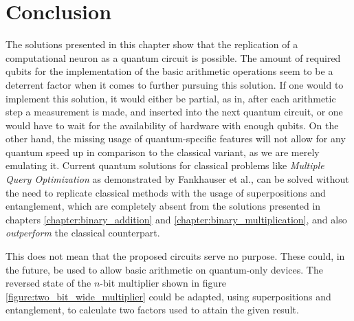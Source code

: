 \newpage


\section{Conclusion}

The solutions presented in this chapter show that the replication of a computational neuron as a quantum circuit is possible. The amount of required qubits for the implementation of the basic arithmetic operations seem to be a deterrent factor when it comes to further pursuing this solution. If one would to implement this solution, it would either be partial, as in, after each arithmetic step a measurement is made, and inserted into the next quantum circuit, or one would have to wait for the availability of hardware with enough qubits\cite{ibm_ibm_nodate}. On the other hand, the missing usage of quantum-specific features will not allow for any quantum speed up in comparison to the classical variant, as we are merely emulating it. Current quantum solutions for classical problems like \emph{Multiple Query Optimization} as demonstrated by Fankhauser et al.\cite{fankhauser_multiple_2021}, can be solved without the need to replicate classical methods with the usage of superpositions and entanglement, which are completely absent from the solutions presented in chapters \ref{chapter:binary_addition} and \ref{chapter:binary_multiplication}, and also \emph{outperform} the classical counterpart. \par
This does not mean that the proposed circuits serve no purpose. These could, in the future, be used to allow basic arithmetic on quantum-only devices. The reversed state of the $n$-bit multiplier shown in figure \ref{figure:two_bit_wide_multiplier} could be adapted, using superpositions and entanglement, to calculate two factors used to attain the given result.